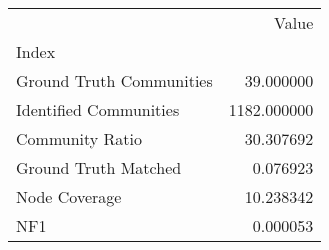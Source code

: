 \begin{tabular}{lr}
\toprule
{} &        Value \\
Index                    &              \\
\midrule
Ground Truth Communities &    39.000000 \\
Identified Communities   &  1182.000000 \\
Community Ratio          &    30.307692 \\
Ground Truth Matched     &     0.076923 \\
Node Coverage            &    10.238342 \\
NF1                      &     0.000053 \\
\bottomrule
\end{tabular}
